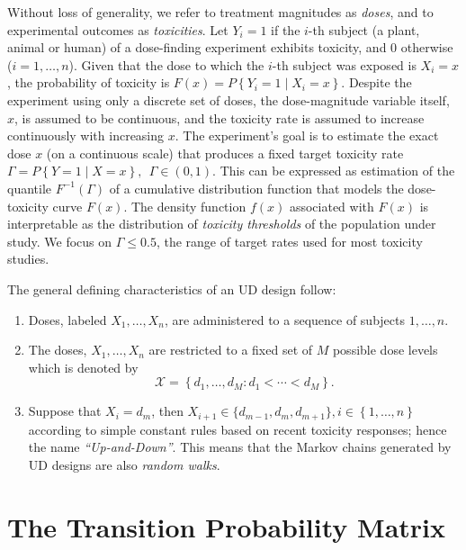 Without loss of generality, we refer to treatment magnitudes as \emph{doses}, and to experimental outcomes as \emph{toxicities}. Let $Y_i = 1$ if the $i$-th subject (a plant, animal or human) of a dose-finding experiment exhibits toxicity, and $0$ otherwise ($i=1,\ldots ,n$). Given that the dose to which the $i$-th subject was exposed is $X_i=x$, the probability of toxicity is $F(x) = P\left\{Y_i=1\mid X_i =x\right\}$. Despite the experiment using only a discrete set of doses, the dose-magnitude variable itself, $x$, is assumed to be continuous, and the toxicity rate is assumed to increase continuously with increasing $x$.  The experiment's goal is to estimate the exact dose $x$ (on a continuous scale) that produces a fixed target toxicity rate $\Gamma=P\left\{Y=1\mid X=x\right\}, \ \ \Gamma\in(0,1)$. This can be expressed as estimation of the quantile  $F^{-1}(\Gamma)$ of a cumulative distribution function that models the dose-toxicity curve $F(x)$.  The density function $f(x)$ associated with $F(x)$ is interpretable as the distribution of \emph{toxicity thresholds} of the population under study. We focus on $\Gamma\leq 0.5$, the range of target rates used for most toxicity studies.

The general defining characteristics of an UD design follow:
\begin{enumerate}
\item Doses, labeled $X_1,\ldots,X_n$, are administered to a sequence of subjects $1,\ldots,n$.
\item The doses,  $X_1,\ldots,X_n$ are restricted to a fixed set of $M$ possible dose levels which is denoted by $$\mathcal{X} =\left\{d_1,\ldots ,d_M : d_1 <\cdots <d_M\right\}.$$
\item Suppose that $X_i=d_m$, then $X_{i+1}\in\{d_{m-1},d_m,d_{m+1}\},i\in\left\{1,\ldots ,n\right\}$ according to simple constant rules based on recent toxicity responses; hence the name \emph{``Up-and-Down''}. This means that the Markov chains generated by UD designs are also \emph{random walks}.
\end{enumerate}

\section{The Transition Probability Matrix}\label{sec:tpm}

